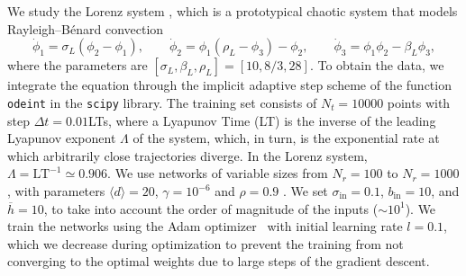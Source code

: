 \documentclass[runningheads]{llncs}
\begin{document}
We study the Lorenz system \cite{lorenz1963deterministic}, which is a prototypical chaotic system that models Rayleigh–Bénard convection
\begin{equation}
\label{lorenz}
    \dot{\phi}_1 = \sigma_L(\phi_2-\phi_1), \qquad
    \dot{\phi}_2 = \phi_1(\rho_L - \phi_3) - \phi_2, \qquad 
    \dot{\phi}_3 = \phi_1\phi_2 - \beta_L \phi_3,
\end{equation}
where the parameters are $[\sigma_L,\beta_L,\rho_L] = [10,8/3,28]$. To obtain the data, we integrate the equation through the implicit adaptive step scheme of the function {\tt odeint} in the {\tt scipy} library. The training set consists of $N_t=10000$ points with step $\Delta t=0.01$LTs, where a Lyapunov Time (LT) is the inverse of the leading Lyapunov exponent $\Lambda$ of the system, which, in turn, is the exponential rate at which arbitrarily close trajectories diverge. In the Lorenz system, $\Lambda = \textrm{LT}^{-1} \simeq 0.906$.
We use networks of variable sizes from $N_r=100$ to $N_r=1000$, with parameters $\langle d\rangle=20$, $\gamma=10^{-6}$ and $\rho=0.9$ \cite{lu2017reservoir}. We set $\sigma_{\mathrm{in}}=0.1$, $b_{\mathrm{in}}=10$, and $\overline{h}=10$, to take into account the order of magnitude of the inputs ($\sim10^1$). We train the networks using the Adam optimizer~\cite{kingma2014adam} with initial learning rate $l=0.1$, which we decrease during optimization to prevent the training from not converging to the optimal weights due to large steps of the gradient descent. %
\end{document}
